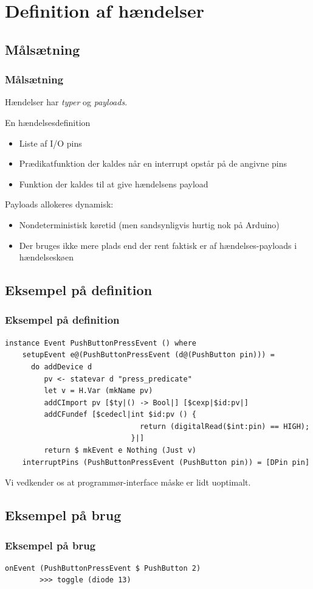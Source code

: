 \documentclass{beamer}
\begin{document}
\section{Definition af hændelser}
\subsection{Målsætning}
\begin{frame}
\frametitle{Målsætning}

Hændelser har \textit{typer} og \textit{payloads}.

\begin{block}{En hændelsesdefinition}
\begin{itemize} 
\item Liste af I/O pins
\item Prædikatfunktion der kaldes når en interrupt opstår på de
  angivne pins
\item Funktion der kaldes til at give hændelsens payload
\end{itemize}
\end{block}

Payloads allokeres dynamisk:

\begin{itemize}
\item Nondeterministisk køretid (men sandsynligvis hurtig nok på
  Arduino)
\item Der bruges ikke mere plads end der rent faktisk er af
  hændelses-payloads i hændelseskøen
\end{itemize}

\end{frame}

\subsection{Eksempel på definition}
\begin{frame}[fragile]
\frametitle{Eksempel på definition}

\tiny
\begin{verbatim}
instance Event PushButtonPressEvent () where
    setupEvent e@(PushButtonPressEvent (d@(PushButton pin))) = 
      do addDevice d
         pv <- statevar d "press_predicate" 
         let v = H.Var (mkName pv)
         addCImport pv [$ty|() -> Bool|] [$cexp|$id:pv|]
         addCFundef [$cedecl|int $id:pv () {
                               return (digitalRead($int:pin) == HIGH);
                             }|]
         return $ mkEvent e Nothing (Just v)
    interruptPins (PushButtonPressEvent (PushButton pin)) = [DPin pin]
\end{verbatim}
\normalsize

\pause

Vi vedkender os at programmør-interface måske er lidt uoptimalt.

\end{frame}

\subsection{Eksempel på brug}
\begin{frame}[fragile]
\frametitle{Eksempel på brug}

\begin{verbatim}
onEvent (PushButtonPressEvent $ PushButton 2) 
        >>> toggle (diode 13)
\end{verbatim}
\normalsize

\end{frame}
\end{document}
